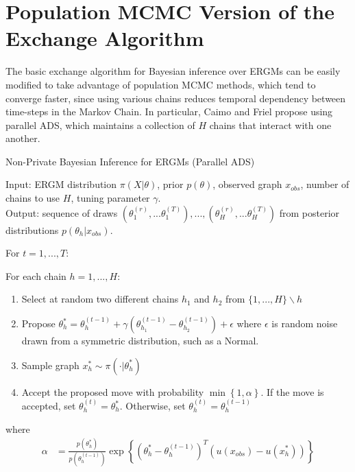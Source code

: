 \section[Population MCMC Version of the Exchange Algorithm]{Population MCMC Version of the \\Exchange Algorithm}

The basic exchange algorithm for Bayesian inference over ERGMs can be easily modified to take advantage of population MCMC methods, which tend to converge faster, since using various chains reduces temporal dependency between time-steps in the Markov Chain. In particular, Caimo and Friel propose using parallel ADS, which maintains a collection of $H$ chains that interact with one another.

\begin{algorithm}[!ht]
	\caption{Non-Private Bayesian Inference for ERGMs (Parallel ADS) \cite{CF11} }
	Input: ERGM distribution $\pi(X | \theta)$, prior $p(\theta)$, observed graph $x_{obs}$, number of chains to use $H$, tuning parameter $\gamma$.\\
	Output: sequence of draws $(\theta_1^{(r)},...\theta_1^{(T)}),...,(\theta_H^{(r)},...\theta_H^{(T)})$ from posterior distributions $p(\theta_h | x_{obs})$.
	
	\vspace{0.1in}
	For {$ t = 1,...,T$}:
	
	\vspace{0.1in}
	
	\hspace{0.1in} For each chain {$ h = 1,...,H$}:
	
	\begin{enumerate}
		\item Select at random  two different chains $h_1$ and $h_2$ from $\{1,...,H\} \backslash h$
		\item  Propose $\theta^*_h = \theta^{(t-1)}_h + \gamma\left(\theta^{(t-1)}_{h_1} -  \theta^{(t-1)}_{h_2}\right) + \epsilon$ 
		\newline where $\epsilon$ is random noise drawn from a symmetric distribution, such as a Normal.
		\item Sample graph $x_h^* \sim \pi(\cdot | \theta_h^*)$
		\item Accept the proposed move with probability $\min\left\{1, \alpha\right\}$. If the move is accepted, set $\theta_h^{(t)} = \theta_h^*$. Otherwise, set $\theta_h^{(t)} = \theta_h^{(t-1)}$
	\end{enumerate}
	where \begin{align*}
	\alpha &= \frac{p(\theta_h^*)}{p(\theta_h^{(t-1)})} \exp\left\{\left(\theta_h^* - \theta_h^{(t-1)}\right)^T\left(u(x_{obs}) - u(x_h^*)\right) \right\}
	\end{align*}
\end{algorithm}

